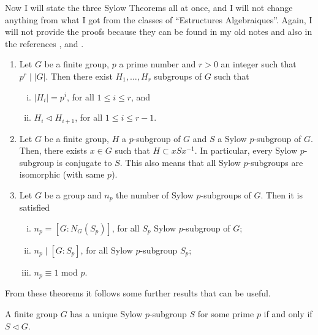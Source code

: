 \documentclass[../main.tex]{subfiles}
\begin{document}
Now I will state the three Sylow Theorems all at once, and I will not change anything from what I got from the classes of ``Estructures Algebraiques''. Again, I will not provide the proofs because they can be found in my old notes and also in the references \cite{rotmanadvancedmodernalgebra}, \cite{hungerfordalgebra} and \cite{dummitfooteabstractalgebra}. 

\begin{ter}[Sylow]\label{ter:sylow}
\begin{enumerate}[(1)]
    \item Let $G$ be a finite group, $p$ a prime number and $r>0$ an integer such that $p^r\mid |G|$. Then there exist $H_1,\ldots,H_r$ subgroups of $G$ such that
    \begin{enumerate}[(i)]
        \item $|H_i| = p^{i}$, for all $1\leq i\leq r$, and
        \item $H_i\vartriangleleft H_{i+1}$, for all $1\leq i\leq r-1$.
    \end{enumerate}
    
    \item Let $G$ be a finite group, $H$ a $p$-subgroup of $G$ and $S$ a Sylow $p$-subgroup of $G$. Then, there exists $x\in G$ such that $H\subset xSx^{-1}$. In particular, every Sylow $p$-subgroup is conjugate to $S$. This also means that all Sylow $p$-subgroups are isomorphic (with same $p$).
    
    \item Let $G$ be a group and $n_p$ the number of Sylow $p$-subgroups of $G$. Then it is satisfied
    \begin{enumerate}[(i)]
        \item $n_p = [G:N_G(S_p)]$, for all $S_p$ Sylow $p$-subgroup of $G$;
        \item $n_p\mid [G:S_p]$, for all Sylow $p$-subgroup $S_p$;
        \item $n_p\equiv 1$ mod $p$.
    \end{enumerate}
\end{enumerate}
\end{ter}


From these theorems it follows some further results that can be useful.

\begin{coro}
A finite group $G$ has a unique Sylow $p$-subgroup $S$ for some prime $p$ if and only if $S\vartriangleleft G$.
\end{coro}
\end{document}
